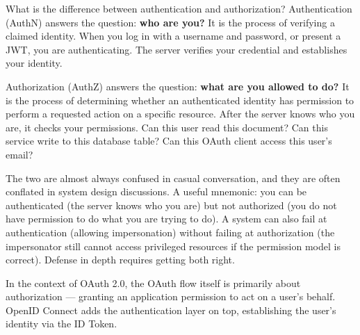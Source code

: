 \documentclass[11pt,a4paper]{article}
\begin{document}
\begin{curiobox}{What is the difference between authentication and authorization?}
Authentication (AuthN) answers the question: \textbf{who are you?} It is the process of verifying a claimed identity. When you log in with a username and password, or present a JWT, you are authenticating. The server verifies your credential and establishes your identity.

Authorization (AuthZ) answers the question: \textbf{what are you allowed to do?} It is the process of determining whether an authenticated identity has permission to perform a requested action on a specific resource. After the server knows who you are, it checks your permissions. Can this user read this document? Can this service write to this database table? Can this OAuth client access this user's email?

The two are almost always confused in casual conversation, and they are often conflated in system design discussions. A useful mnemonic: you can be authenticated (the server knows who you are) but not authorized (you do not have permission to do what you are trying to do). A system can also fail at authentication (allowing impersonation) without failing at authorization (the impersonator still cannot access privileged resources if the permission model is correct). Defense in depth requires getting both right.

In the context of OAuth 2.0, the OAuth flow itself is primarily about authorization --- granting an application permission to act on a user's behalf. OpenID Connect adds the authentication layer on top, establishing the user's identity via the ID Token.
\end{curiobox}
\end{document}
